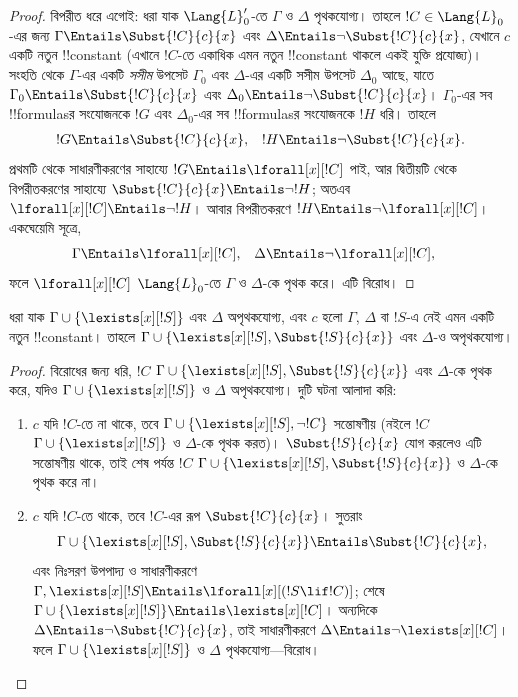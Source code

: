 \documentclass[../../../include/open-logic-section]{subfiles}
\begin{document}
\begin{proof}
বিপরীত ধরে এগোই: ধরা যাক $\Lang{L}'_0$-তে $\Gamma$ ও $\Delta$
পৃথকযোগ্য। তাহলে $!C \in \Lang{L}_0$-এর জন্য
$\Gamma \Entails \Subst{!C}{c}{x}$ এবং
$\Delta \Entails \lnot \Subst{!C}{c}{x}$, যেখানে $c$ একটি নতুন
!!{constant} (এখানে $!C$-তে একাধিক এমন নতুন !!{constant} থাকলে একই
যুক্তি প্রযোজ্য)। সংহতি থেকে $\Gamma$-এর একটি \emph{সসীম}
উপসেট $\Gamma_0$ এবং $\Delta$-এর একটি সসীম উপসেট $\Delta_0$ আছে,
যাতে $\Gamma_0 \Entails \Subst{!C}{c}{x}$ এবং
$\Delta_0 \Entails \lnot \Subst{!C}{c}{x}$। $\Gamma_0$-এর
সব !!{formula}sর সংযোজনকে $!G$ এবং $\Delta_0$-এর সব !!{formula}sর
সংযোজনকে $!H$ ধরি। তাহলে
\begin{align*}
  !G & \Entails \Subst{!C}{c}{x}, & !H  \Entails \lnot \Subst{!C}{c}{x}.
\end{align*}
প্রথমটি থেকে সাধারণীকরণের সাহায্যে $!G \Entails \lforall[x][!C]$
পাই, আর দ্বিতীয়টি থেকে বিপরীতকরণের সাহায্যে
$\Subst{!C}{c}{x} \Entails \lnot !H$; অতএব
$\lforall[x][!C] \Entails \lnot !H$। আবার বিপরীতকরণে
$!H \Entails \lnot \lforall[x][!C]$। একঘেয়েমি সূত্রে,
\begin{align*}
  \Gamma & \Entails \lforall[x][!C], &
  \Delta & \Entails \lnot \lforall[x][!C],
\end{align*}
ফলে $\lforall[x][!C]$ $\Lang{L}_0$-তে $\Gamma$ ও $\Delta$-কে
পৃথক করে। এটি বিরোধ।
\end{proof}

\begin{lem}
ধরা যাক $\Gamma \cup \{ \lexists[x][!S] \}$ এবং $\Delta$
অপৃথকযোগ্য, এবং $c$ হলো $\Gamma$, $\Delta$ বা $!S$-এ নেই এমন
একটি নতুন !!{constant}। তাহলে $\Gamma \cup \{
\lexists[x][!S], \Subst{!S}{c}{x} \}$ এবং $\Delta$-ও
অপৃথকযোগ্য।
\end{lem}

\begin{proof}
বিরোধের জন্য ধরি, $!C$ $\Gamma \cup \{
\lexists[x][!S], \Subst{!S}{c}{x}\}$ এবং $\Delta$-কে পৃথক করে,
যদিও $\Gamma \cup \{\lexists[x][!S] \}$ ও $\Delta$
অপৃথকযোগ্য। দুটি ঘটনা আলাদা করি:
\begin{enumerate}
\item $c$ যদি $!C$-তে না থাকে, তবে
  $\Gamma \cup \{\lexists[x][!S], \lnot!C \}$ সন্তোষণীয়
  (নইলে $!C$ $\Gamma \cup \{\lexists[x][!S] \}$ ও $\Delta$-কে
  পৃথক করত)। $\Subst{!S}{c}{x}$ যোগ করলেও এটি সন্তোষণীয় থাকে, তাই
  শেষ পর্যন্ত $!C$ $\Gamma \cup \{ \lexists[x][!S],
  \Subst{!S}{c}{x} \}$ ও $\Delta$-কে পৃথক করে না।
\item $c$ যদি $!C$-তে থাকে, তবে $!C$-এর রূপ
  $\Subst{!C}{c}{x}$। সুতরাং
   \[
  \Gamma \cup \{ \lexists[x][!S], \Subst{!S}{c}{x}\} \Entails \Subst{!C}{c}{x},
   \]
  এবং নিঃসরণ উপপাদ্য ও সাধারণীকরণে
  $\Gamma, \lexists[x][!S] \Entails \lforall[x][(!S \lif !C)]$;
  শেষে $\Gamma \cup \{ \lexists[x][!S] \} \Entails
  \lexists[x][!C]$। অন্যদিকে
  $\Delta \Entails \lnot \Subst{!C}{c}{x}$, তাই সাধারণীকরণে
  $\Delta \Entails \lnot \lexists[x][!C]$। ফলে
  $\Gamma \cup \{\lexists[x][!S] \}$ ও $\Delta$ পৃথকযোগ্য—বিরোধ।
\end{enumerate}
\end{proof}
\end{document}
